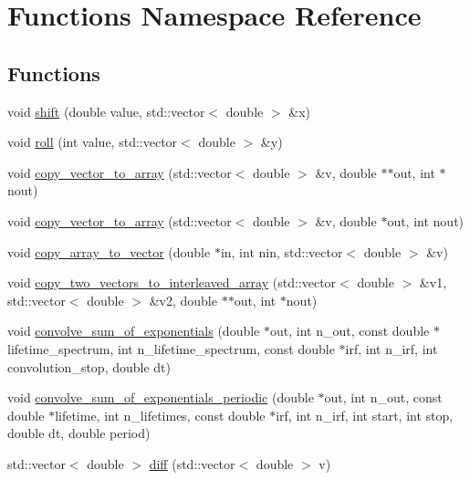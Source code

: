 \hypertarget{namespace_functions}{}\section{Functions Namespace Reference}
\label{namespace_functions}
\subsection*{Functions}
\begin{DoxyCompactItemize}
\item 
void \hyperlink{namespace_functions_a9327d93975ced0eda3d86e7cc0eaa2ce}{shift} (double value, std\+::vector$<$ double $>$ \&x)
\item 
void \hyperlink{namespace_functions_a3f9558335e568ef96875e356712737d5}{roll} (int value, std\+::vector$<$ double $>$ \&y)
\item 
void \hyperlink{namespace_functions_a2f190c8d48a79957846060e91638daf0}{copy\+\_\+vector\+\_\+to\+\_\+array} (std\+::vector$<$ double $>$ \&v, double $\ast$$\ast$out, int $\ast$nout)
\item 
void \hyperlink{namespace_functions_a89a9951b3cfcc5c8e51d53a95361a722}{copy\+\_\+vector\+\_\+to\+\_\+array} (std\+::vector$<$ double $>$ \&v, double $\ast$out, int nout)
\item 
void \hyperlink{namespace_functions_a680d81633db9ad1074e4053e49aab936}{copy\+\_\+array\+\_\+to\+\_\+vector} (double $\ast$in, int nin, std\+::vector$<$ double $>$ \&v)
\item 
void \hyperlink{namespace_functions_a8e230f278da41398c7475369f9dcf100}{copy\+\_\+two\+\_\+vectors\+\_\+to\+\_\+interleaved\+\_\+array} (std\+::vector$<$ double $>$ \&v1, std\+::vector$<$ double $>$ \&v2, double $\ast$$\ast$out, int $\ast$nout)
\item 
void \hyperlink{namespace_functions_a2ba36946f1e5125d51a9970f3b8300ea}{convolve\+\_\+sum\+\_\+of\+\_\+exponentials} (double $\ast$out, int n\+\_\+out, const double $\ast$lifetime\+\_\+spectrum, int n\+\_\+lifetime\+\_\+spectrum, const double $\ast$irf, int n\+\_\+irf, int convolution\+\_\+stop, double dt)
\item 
void \hyperlink{namespace_functions_ae70edf0473b6bebe1325e50b3971ef22}{convolve\+\_\+sum\+\_\+of\+\_\+exponentials\+\_\+periodic} (double $\ast$out, int n\+\_\+out, const double $\ast$lifetime, int n\+\_\+lifetimes, const double $\ast$irf, int n\+\_\+irf, int start, int stop, double dt, double period)
\item 
std\+::vector$<$ double $>$ \hyperlink{namespace_functions_af4928f5c5dcc2034838ac8cd3c1ad2a4}{diff} (std\+::vector$<$ double $>$ v)

\end{DoxyCompactItemize}
